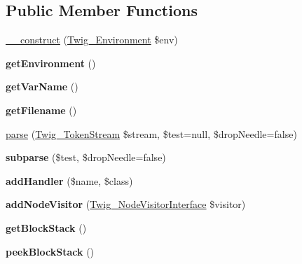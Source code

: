 \subsection*{Public Member Functions}
\begin{DoxyCompactItemize}
\item 
\hyperlink{classTwig__Parser_adfea370bf49f219d75c34281d0b2aeb0}{\+\_\+\+\_\+construct} (\hyperlink{classTwig__Environment}{Twig\+\_\+\+Environment} \$env)
\item 
{\bfseries get\+Environment} ()\hypertarget{classTwig__Parser_aab517851e74b902bf63c87c74e66c9ac}{}\label{classTwig__Parser_aab517851e74b902bf63c87c74e66c9ac}

\item 
{\bfseries get\+Var\+Name} ()\hypertarget{classTwig__Parser_a9e77c83a4b67140abf2aac4b0c982336}{}\label{classTwig__Parser_a9e77c83a4b67140abf2aac4b0c982336}

\item 
{\bfseries get\+Filename} ()\hypertarget{classTwig__Parser_abab94463625b2f07d51f45c5f8282804}{}\label{classTwig__Parser_abab94463625b2f07d51f45c5f8282804}

\item 
\hyperlink{classTwig__Parser_a628f56afce1ee860c30de78b347b62e7}{parse} (\hyperlink{classTwig__TokenStream}{Twig\+\_\+\+Token\+Stream} \$stream, \$test=null, \$drop\+Needle=false)
\item 
{\bfseries subparse} (\$test, \$drop\+Needle=false)\hypertarget{classTwig__Parser_a4975407039686dc86ad3a64feaabea70}{}\label{classTwig__Parser_a4975407039686dc86ad3a64feaabea70}

\item 
{\bfseries add\+Handler} (\$name, \$class)\hypertarget{classTwig__Parser_a9c32f5dc12706cd6c06b5c5bd264048d}{}\label{classTwig__Parser_a9c32f5dc12706cd6c06b5c5bd264048d}

\item 
{\bfseries add\+Node\+Visitor} (\hyperlink{interfaceTwig__NodeVisitorInterface}{Twig\+\_\+\+Node\+Visitor\+Interface} \$visitor)\hypertarget{classTwig__Parser_a4e8f60ba79bc75796a836a5e564bc364}{}\label{classTwig__Parser_a4e8f60ba79bc75796a836a5e564bc364}

\item 
{\bfseries get\+Block\+Stack} ()\hypertarget{classTwig__Parser_aaa33cf362642fe5444b0fb6a79509e83}{}\label{classTwig__Parser_aaa33cf362642fe5444b0fb6a79509e83}

\item 
{\bfseries peek\+Block\+Stack} ()\hypertarget{classTwig__Parser_a06a95aa96b33333461bfdd32bbdcdc4f}{}\label{classTwig__Parser_a06a95aa96b33333461bfdd32bbdcdc4f}


\end{DoxyCompactItemize}
